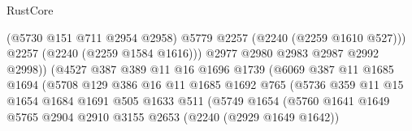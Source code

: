 \begin{lexlean}{RustCore}
\begin{coremodule}
                                            (@5730 @151 @711 @2954 @2958)
                                            @5779
                                            @2257
                                            (@2240 (@2259 @1610 @527)))
                                          @2257
                                          (@2240 (@2259 @1584 @1616)))
                                        @2977
                                        @2980
                                        @2983
                                        @2987
                                        @2992
                                        @2998))
                                    (@4527
                                      @387
                                      @389
                                      @11
                                      @16
                                      @1696
                                      @1739
                                      (@6069
                                        @387
                                        @11
                                        @1685
                                        @1694
                                        (@5708
                                          @129
                                          @386
                                          @16
                                          @11
                                          @1685
                                          @1692
                                          @765
                                          (@5736
                                            @359
                                            @11
                                            @15
                                            @1654
                                            @1684
                                            @1691
                                            @505
                                            @1633
                                            @511
                                            (@5749
                                              @1654
                                              (@5760
                                                @1641
                                                @1649
                                                @5765
                                                @2904
                                                @2910
                                                @3155
                                                @2653
                                                (@2240 (@2929 @1649 @1642))

\end{coremodule}
\end{lexlean}

